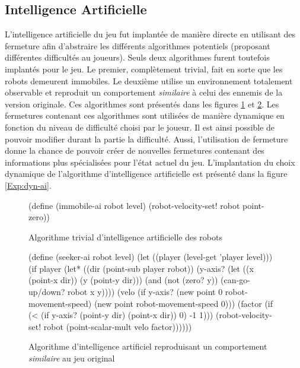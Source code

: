 \documentclass[12pt,twoside,letterpaper,francais]{book}
\begin{document}
\FloatBarrier
\subsection{Intelligence Artificielle}
L'intelligence artificielle du jeu fut implantée de manière directe en
utilisant des fermeture afin d'abstraire les différents algorithmes
potentiels (proposant différentes difficultés au joueurs). Seuls deux
algorithmes furent toutefois implantés pour le jeu. Le premier,
complètement trivial, fait en sorte que les robots demeurent
immobiles.  Le deuxième utilise un environnement totalement observable
et reproduit un comportement \emph{similaire} à celui des ennemis de
la version originale. Ces algorithmes sont présentés dans les figures
\ref{Exp:ai-imm} et \ref{Exp:ai-seek}. Les fermetures contenant ces
algorithmes sont utilisées de manière dynamique en fonction du niveau
de difficulté choisi par le joueur. Il est ainsi possible de pouvoir
modifier durant la partie la difficulté. Aussi, l'utilisation de
fermeture donne la chance de pouvoir créer de nouvelles fermetures
contenant des informations plus spécialisées pour l'état actuel du
jeu. L'implantation du choix dynamique de l'algorithme d'intelligence
artificielle est présenté dans la figure \ref{Exp:dyn-ai}.

\begin{figure}[htb!]
  \begin{schemecode}
(define (immobile-ai robot level)
  (robot-velocity-set! robot point-zero))
  \end{schemecode}
  \caption{Algorithme trivial d'intelligence artificielle des robots}
  \label{Exp:ai-imm}
\end{figure}

\begin{figure}[htb!]
  \begin{schemecode}
(define (seeker-ai robot level)
  (let ((player (level-get 'player level)))
    (if player
        (let* ((dir (point-sub player robot))
               (y-axis? (let ((x (point-x dir)) (y (point-y dir)))
                          (and (not (zero? y))
                               (can-go-up/down? robot x y))))
               (velo (if y-axis?
                         (new point 0 robot-movement-speed)
                         (new point robot-movement-speed 0)))
               (factor (if (< (if y-axis? (point-y dir) (point-x dir)) 0)
                           -1
                           1)))
          (robot-velocity-set! robot (point-scalar-mult velo factor))))))
  \end{schemecode}
  \caption{Algorithme d'intelligence artificiel reproduisant un
    comportement \emph{similaire} au jeu original}
  \label{Exp:ai-seek}
\end{figure}
\end{document}
